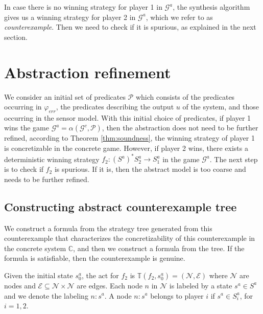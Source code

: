 \documentclass[letterpaper, 10 pt, conference]{ieeeconf}
\begin{document}
In case there is no winning strategy for player 1 in $\mathcal{G}^a$,
the synthesis algorithm gives us a winning strategy for player 2 in $\mathcal{G}^a$,
which we refer to as \emph{counterexample}. Then we need to check if
it is spurious, as explained in the next
section.


\section{Abstraction refinement}
We consider an initial set of predicates $\mathcal{P}$ which consists
of the predicates occurring in $\varphi_{err}$, the predicates
describing the output $u$ of the system, and those
occurring in the sensor model.  With this initial choice of predicates,
if player 1 wins the game $\mathcal{G}^a =
\alpha(\mathcal{G}^c,\mathcal{P})$, then the abstraction does not need
to be further refined,  according to Theorem \ref{thm:soundness},
the winning strategy of player 1 is concretizable in the concrete
game.  However, if player 2 wins, there exists a deterministic winning strategy $f_2: (S^a)^\ast
S^a_2 \rightarrow S^a_1$ in the game
$\mathcal{G}^a$. The next step is to check if $f_2$ is
spurious. If it is, then the abstract model is too coarse and needs to
be further refined.

\subsection{Constructing abstract counterexample tree}
We construct a formula from the strategy tree generated from this
counterexample that characterizes the concretizability of this counterexample in the
concrete system $\mathbb{C}$, and then we construct a formula from the
 tree. If the formula is satisfiable, then the counterexample is genuine.

 Given the initial state $s^a_0 $, the \ac{act} for $f_2$ is
 $\mathbb{T}(f_2,s^a_0 ) = (\mathcal{N}, \mathcal{E})$ where
 $\mathcal{N}$ are nodes and $\mathcal{E} \subseteq \mathcal{N}\times
 \mathcal{N}$ are edges.  Each node $n$ in $\mathcal{N}$ is labeled by
 a state $s^a\in S^a$ and we denote the labeling $n:s^a$.  A node
 $n:s^a$ belongs to player $i$ if $s^a \in S^a_i$, for $i =1,2$.
\end{document}
